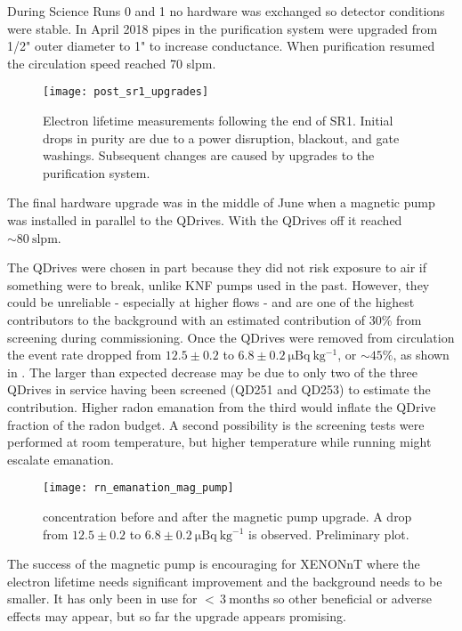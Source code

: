 During Science Runs 0 and 1 no hardware was exchanged so detector conditions were stable.  In April 2018 pipes in the purification
system were upgraded from 1/2" outer diameter to 1" to increase conductance.  When purification resumed the circulation speed reached
70 slpm.

\begin{figure}
\centering
\texttt{[image: post\_sr1\_upgrades]}
\caption{Electron lifetime measurements following the end of SR1.  Initial drops in purity are due to a power disruption, blackout, and gate
washings.  Subsequent changes are caused by upgrades to the purification system.}
\label{fig:electron_lifetime_model_ops_post_sr1}
\end{figure}

The final hardware upgrade was in the middle of June when a magnetic pump was installed in parallel to the QDrives.  With the QDrives off
it reached ${\sim} 80\ \mathrm{slpm}$.

The QDrives were chosen in part because they did not risk exposure to air if something were to
break, unlike KNF pumps used in the past.  However, they could be unreliable - especially at higher flows - and
are one of the highest contributors to the 
background with an estimated contribution of 30\% from screening during commissioning.  Once the QDrives were removed from circulation the
 event rate dropped from $12.5 \pm 0.2$ to
$6.8 \pm 0.2\ \mathrm{\mu Bq\ kg^{-1}}$, or ${\sim} 45\%$, as shown in .  The larger
than expected decrease may be due to only two of the three QDrives in service having been screened (QD251 and QD253) to estimate the
contribution.  Higher radon emanation from the third would inflate
the QDrive fraction of the radon budget.  A second possibility is the screening tests were performed at room temperature, but higher
temperature while running might escalate emanation.

\begin{figure}
\centering
\texttt{[image: rn\_emanation\_mag\_pump]}
\caption{ concentration before and after the magnetic pump upgrade.  A drop from
$12.5 \pm 0.2$ to $6.8 \pm 0.2\ \mathrm{\mu Bq\ kg^{-1}}$ is observed.  Preliminary plot.}
\label{fig:electron_lifetime_model_ops_rn_emanation}
\end{figure}

The success of the magnetic pump is encouraging for XENONnT where the electron lifetime needs significant improvement and the background
needs to be smaller.  It has only been in use for ${<}\, 3\ \mathrm{months}$ so other beneficial or adverse effects may appear, but so
far the upgrade appears promising.


